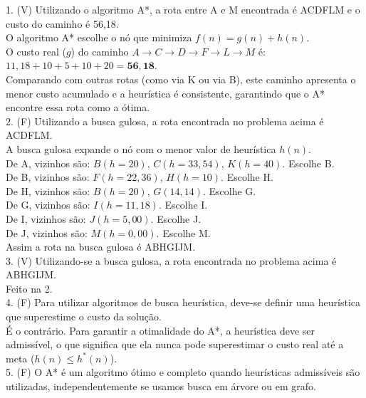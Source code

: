 \documentclass[a4paper,12pt]{article}
\begin{document}
\bigskip

1. (V) Utilizando o algoritmo A*, a rota entre A e M encontrada é ACDFLM e o custo do caminho é 56,18.\\

O algoritmo A* escolhe o nó que minimiza $f(n) = g(n) + h(n)$.\\
O custo real ($g$) do caminho $A \to C \to D \to F \to L \to M$ é: $11,18 + 10 + 5 + 10 + 20 = \mathbf{56,18}$.\\
Comparando com outras rotas (como via K ou via B), este caminho apresenta o menor custo acumulado e a heurística é consistente, garantindo que o A* encontre essa rota como a ótima.\\

2. (F) Utilizando a busca gulosa, a rota encontrada no problema acima é ACDFLM.\\

A busca gulosa expande o nó com o menor valor de heurística $h(n)$.\\
De A, vizinhos são: $B(h=20)$, $C(h=33,54)$, $K(h=40)$. Escolhe B.\\
De B, vizinhos são: $F(h=22,36)$, $H(h=10)$. Escolhe H.\\
De H, vizinhos são: $B(h=20)$, $G(14,14)$. Escolhe G.\\
De G, vizinhos são: $I(h=11,18)$. Escolhe I.\\
De I, vizinhos são: $J(h=5,00)$. Escolhe J.\\
De J, vizinhos são: $M(h=0,00)$. Escolhe M.\\
Assim a rota na busca gulosa é ABHGIJM.\\


3. (V) Utilizando-se a busca gulosa, a rota encontrada no problema acima é ABHGIJM.\\

Feito na 2.\\

4. (F) Para utilizar algoritmos de busca heurística, deve-se definir uma heurística que superestime o custo da solução.\\

É o contrário. Para garantir a otimalidade do A*, a heurística deve ser admissível, o que significa que ela nunca pode superestimar o custo real até a meta ($h(n) \leq h^*(n)$). \\

5. (F) O A* é um algoritmo ótimo e completo quando heurísticas admissíveis são utilizadas, independentemente se usamos busca em árvore ou em grafo.\\
\end{document}
